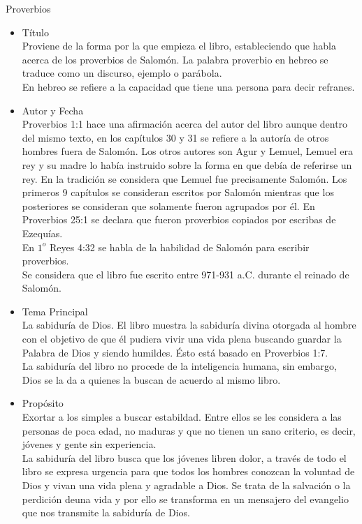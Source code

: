 %
%
\begin{section}{Proverbios}
	\begin{itemize}
		\item Título\\
			Proviene de la forma por la que empieza el libro, estableciendo que habla acerca de los proverbios de Salomón. La palabra proverbio en hebreo se traduce como un discurso, ejemplo o parábola.\\
			En hebreo se refiere a la capacidad que tiene una persona para decir refranes.
		\item Autor y Fecha\\
			Proverbios 1:1 hace una afirmación acerca del autor del libro aunque dentro del mismo texto, en los capítulos 30 y 31 se refiere a la autoría de otros hombres fuera de Salomón. Los otros autores son Agur y Lemuel, Lemuel era rey y su madre lo había instruido sobre la forma en que debía de referirse un rey. En la tradición se considera que Lemuel fue precisamente Salomón. Los primeros 9 capítulos se consideran escritos por Salomón mientras que los posteriores se consideran que solamente fueron agrupados por él. En Proverbios 25:1 se declara que fueron proverbios copiados por escribas de Ezequías.\\
			En $1^{o}$ Reyes 4:32 se habla de la habilidad de Salomón para escribir proverbios.\\
			Se considera que el libro fue escrito entre 971-931 a.C. durante el reinado de Salomón.
		\item Tema Principal\\
			La sabiduría de Dios. El libro muestra la sabiduría divina otorgada al hombre con el objetivo de que él pudiera vivir una vida plena buscando guardar la Palabra de Dios y siendo humildes. Ésto está basado en Proverbios 1:7.\\
			La sabiduría del libro no procede de la inteligencia humana, sin embargo, Dios se la da a quienes la buscan de acuerdo al mismo libro.
		\item Propósito\\
			Exortar a los simples a buscar estabildad. Entre ellos se les considera a las personas de poca edad, no maduras y que no tienen un sano criterio, es decir, jóvenes y gente sin experiencia.\\
			La sabiduría del libro busca que los jóvenes libren dolor, a través de todo el libro se expresa urgencia para que todos los hombres conozcan la voluntad de Dios y vivan una vida plena y agradable a Dios. Se trata de la salvación o la perdición deuna vida y por ello se transforma en un mensajero del evangelio que nos transmite la sabiduría de Dios.

\end{itemize}
\end{section}
